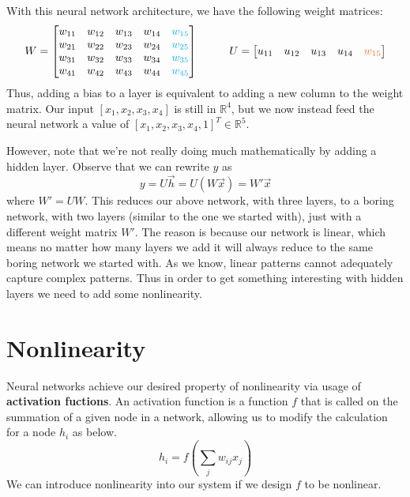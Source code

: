 \documentclass[12pt,letterpaper]{book}
\theoremstyle{definition}
\begin{document}
  With this neural network architecture, we have the following weight matrices:
  \[
    W = \begin{bmatrix}
      w_{11} & w_{12} & w_{13} & w_{14} & \textcolor{ProcessBlue}{w_{15}} \\
      w_{21} & w_{22} & w_{23} & w_{24} & \textcolor{ProcessBlue}{w_{25}}\\
      w_{31} & w_{32} & w_{33} & w_{34} & \textcolor{ProcessBlue}{w_{35}}\\
      w_{41} & w_{42} & w_{43} & w_{44} & \textcolor{ProcessBlue}{w_{45}}\\
    \end{bmatrix}
    \hspace{1cm}
    U = \begin{bmatrix}
      u_{11} & u_{12} & u_{13} & u_{14} & \textcolor{Orange}{w_{15}} \\
    \end{bmatrix}
  \]
  Thus, adding a bias to a layer is equivalent to adding a new column to the weight matrix. 
  Our input $[x_1, x_2, x_3, x_4]$ is still in $\mathbb{R}^4$, but we now instead 
  feed the neural network a value of $[x_1, x_2, x_3, x_4, 1]^T \in \mathbb{R}^5.$

  However, note that we're not really doing much mathematically by adding a hidden layer. 
  Observe that we can rewrite $y$ as 
  \[
      y = U\vec{h} = U(W\vec{x}) = W'\vec{x} 
  \]
  where $W' = UW$. This reduces our above network, with three layers, to a boring network, with two layers (similar to the one 
  we started with), just with a different weight matrix $W'$. 
  The reason is because our network is linear, which means 
  no matter how many layers we add it will always reduce to the same boring network we started with. 
  As we know, linear patterns cannot adequately capture complex patterns.
  Thus in order to get something interesting with hidden layers we need to add some nonlinearity.
  
  \section{Nonlinearity}
  Neural networks achieve our desired property of nonlinearity via usage of \textbf{activation fuctions}.
  An activation function is a function $f$ that is called on the summation of a given node in a network, allowing 
  us to modify the calculation for a node $h_i$ as below.
  \[
    h_i = f\left(\sum_{j}w_{ij}x_j\right)
  \]
  We can introduce nonlinearity into our system if we design $f$ to be nonlinear. 
\end{document}
